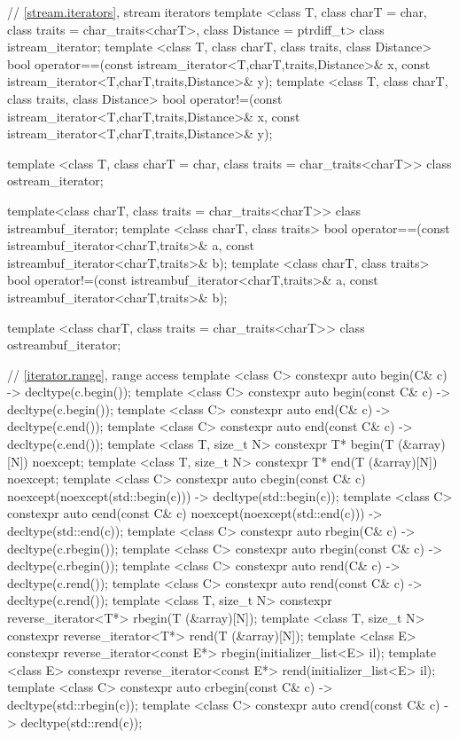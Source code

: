 \begin{codeblock}
{  // \ref{stream.iterators}, stream iterators
  template <class T, class charT = char, class traits = char_traits<charT>,
      class Distance = ptrdiff_t>
  class istream_iterator;
  template <class T, class charT, class traits, class Distance>
    bool operator==(const istream_iterator<T,charT,traits,Distance>& x,
            const istream_iterator<T,charT,traits,Distance>& y);
  template <class T, class charT, class traits, class Distance>
    bool operator!=(const istream_iterator<T,charT,traits,Distance>& x,
            const istream_iterator<T,charT,traits,Distance>& y);

  template <class T, class charT = char, class traits = char_traits<charT>>
      class ostream_iterator;

  template<class charT, class traits = char_traits<charT>>
    class istreambuf_iterator;
  template <class charT, class traits>
    bool operator==(const istreambuf_iterator<charT,traits>& a,
            const istreambuf_iterator<charT,traits>& b);
  template <class charT, class traits>
    bool operator!=(const istreambuf_iterator<charT,traits>& a,
            const istreambuf_iterator<charT,traits>& b);

  template <class charT, class traits = char_traits<charT>>
    class ostreambuf_iterator;

  // \ref{iterator.range}, range access
  template <class C> constexpr auto begin(C& c) -> decltype(c.begin());
  template <class C> constexpr auto begin(const C& c) -> decltype(c.begin());
  template <class C> constexpr auto end(C& c) -> decltype(c.end());
  template <class C> constexpr auto end(const C& c) -> decltype(c.end());
  template <class T, size_t N> constexpr T* begin(T (&array)[N]) noexcept;
  template <class T, size_t N> constexpr T* end(T (&array)[N]) noexcept;
  template <class C> constexpr auto cbegin(const C& c) noexcept(noexcept(std::begin(c)))
    -> decltype(std::begin(c));
  template <class C> constexpr auto cend(const C& c) noexcept(noexcept(std::end(c)))
    -> decltype(std::end(c));
  template <class C> constexpr auto rbegin(C& c) -> decltype(c.rbegin());
  template <class C> constexpr auto rbegin(const C& c) -> decltype(c.rbegin());
  template <class C> constexpr auto rend(C& c) -> decltype(c.rend());
  template <class C> constexpr auto rend(const C& c) -> decltype(c.rend());
  template <class T, size_t N> constexpr reverse_iterator<T*> rbegin(T (&array)[N]);
  template <class T, size_t N> constexpr reverse_iterator<T*> rend(T (&array)[N]);
  template <class E> constexpr reverse_iterator<const E*> rbegin(initializer_list<E> il);
  template <class E> constexpr reverse_iterator<const E*> rend(initializer_list<E> il);
  template <class C> constexpr auto crbegin(const C& c) -> decltype(std::rbegin(c));
  template <class C> constexpr auto crend(const C& c) -> decltype(std::rend(c));

}
\end{codeblock}
